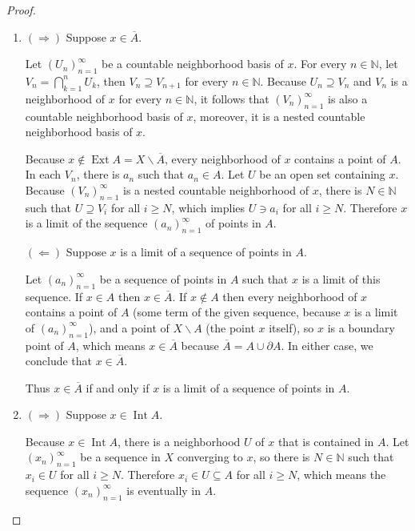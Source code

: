 \begin{proof}
	\begin{enumerate}[label={(\alph*)}]
		\item $(\Longrightarrow)$ Suppose $x\in \overline{A}$.

		      Let ${(U_{n})}^{\infty}_{n=1}$ be a countable neighborhood basis of $x$. For every $n\in\mathbb{N}$, let $V_{n} = \bigcap^{n}_{k=1}U_{k}$, then $V_{n}\supseteq V_{n+1}$ for every $n\in\mathbb{N}$. Because $U_{n}\supseteq V_{n}$ and $V_{n}$ is a neighborhood of $x$ for every $n\in\mathbb{N}$, it follows that ${(V_{n})}^{\infty}_{n=1}$ is also a countable neighborhood basis of $x$, moreover, it is a nested countable neighborhood basis of $x$.

		      Because $x\notin\operatorname{Ext}A = X\smallsetminus\overline{A}$, every neighborhood of $x$ contains a point of $A$. In each $V_{n}$, there is $a_{n}$ such that $a_{n}\in A$. Let $U$ be an open set containing $x$. Because ${(V_{n})}^{\infty}_{n=1}$ is a nested countable neighborhood of $x$, there is $N\in\mathbb{N}$ such that $U\supseteq V_{i}$ for all $i\geq N$, which implies $U\ni a_{i}$ for all $i\geq N$. Therefore $x$ is a limit of the sequence ${(a_{n})}^{\infty}_{n=1}$ of points in $A$.

		      $(\Longleftarrow)$ Suppose $x$ is a limit of a sequence of points in $A$.

		      Let ${(a_{n})}^{\infty}_{n=1}$ be a sequence of points in $A$ such that $x$ is a limit of this sequence. If $x\in A$ then $x\in\overline{A}$. If $x\notin A$ then every neighborhood of $x$ contains a point of $A$ (some term of the given sequence, because $x$ is a limit of ${(a_{n})}^{\infty}_{n=1}$), and a point of $X\smallsetminus A$ (the point $x$ itself), so $x$ is a boundary point of $A$, which means $x\in\overline{A}$ because $\overline{A} = A\cup\partial A$. In either case, we conclude that $x\in \overline{A}$.

		      Thus $x\in\overline{A}$ if and only if $x$ is a limit of a sequence of points in $A$.
		\item $(\Longrightarrow)$ Suppose $x\in\operatorname{Int} A$.

		      Because $x\in\operatorname{Int} A$, there is a neighborhood $U$ of $x$ that is contained in $A$. Let ${(x_{n})}^{\infty}_{n=1}$ be a sequence in $X$ converging to $x$, so there is $N\in\mathbb{N}$ such that $x_{i}\in U$ for all $i\geq N$. Therefore $x_{i}\in U\subseteq A$ for all $i\geq N$, which means the sequence ${(x_{n})}^{\infty}_{n=1}$ is eventually in $A$.


\end{enumerate}
\end{proof}
